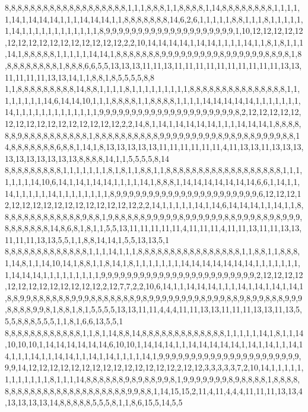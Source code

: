 8,8,8,8,8,8,8,8,8,8,8,8,8,8,8,8,8,8,8,1,1,1,8,8,8,1,1,8,8,8,8,1,14,8,8,8,8,8,8,8,8,1,1,1,1,1,14,1,14,14,14,1,1,1,14,14,14,1,1,8,8,8,8,8,8,8,14,6,2,6,1,1,1,1,1,8,8,1,1,1,8,1,1,1,1,1,1,14,1,1,1,1,1,1,1,1,1,1,1,1,8,9,9,9,9,9,9,9,9,9,9,9,9,9,9,9,9,9,9,9,9,1,10,12,12,12,12,12,12,12,12,12,12,12,12,12,12,12,12,2,2,10,14,14,14,14,1,14,14,1,1,1,1,14,1,1,8,1,8,1,1,1,14,1,8,8,8,8,8,1,1,1,1,1,14,14,1,8,8,8,8,8,8,8,9,9,9,9,9,9,9,9,9,8,9,9,9,9,9,9,8,8,9,8,1,8,8,8,8,8,8,8,8,8,1,8,8,8,6,6,5,5,13,13,13,11,11,13,11,11,11,11,11,11,11,11,11,11,13,13,11,11,11,11,13,13,14,1,1,8,8,1,8,5,5,5,5,8,8
1,1,8,8,8,8,8,8,8,8,8,14,8,8,1,1,1,1,8,1,1,1,1,1,1,1,1,1,8,8,8,8,8,8,8,8,8,8,8,8,8,8,8,1,1,1,1,1,1,1,1,14,6,14,14,10,1,1,1,8,8,8,8,1,1,8,8,8,8,1,1,1,1,14,14,14,14,14,1,1,1,1,1,1,1,14,1,1,1,1,1,1,1,1,1,1,1,1,1,9,9,9,9,9,9,9,9,9,9,9,9,9,9,9,9,9,9,9,9,9,8,2,12,12,12,12,12,12,12,12,12,12,12,12,12,12,12,12,2,2,14,8,1,14,1,14,14,14,14,1,1,1,14,14,14,1,8,8,8,8,8,8,9,8,8,8,8,8,8,8,8,8,8,1,8,8,8,8,8,8,8,8,8,8,9,9,9,9,9,9,9,9,9,8,9,8,9,8,8,9,9,9,9,8,8,14,8,8,8,8,8,8,8,6,8,8,1,14,1,8,13,13,13,13,13,11,11,11,11,11,11,4,11,13,13,11,13,13,13,13,13,13,13,13,13,13,8,8,8,8,14,1,1,5,5,5,5,8,14
8,8,8,8,8,8,8,8,8,1,1,1,1,1,1,1,8,1,8,1,1,8,8,1,1,8,8,8,8,8,8,8,8,8,8,8,8,8,8,8,8,8,8,1,1,1,1,1,1,1,14,10,6,14,1,14,1,14,14,1,1,1,1,14,1,8,8,8,1,14,14,14,14,14,14,14,6,6,1,14,1,1,14,1,1,1,1,1,14,1,1,1,1,1,1,1,1,8,9,9,9,9,9,9,9,9,9,9,9,9,9,9,9,9,9,9,9,9,9,9,6,12,12,12,12,12,12,12,12,12,12,12,12,12,12,12,12,2,2,14,1,1,1,1,1,14,1,14,6,14,14,14,1,1,14,1,1,8,8,8,8,8,8,8,8,8,8,8,8,8,9,8,8,1,9,8,8,8,8,8,9,9,9,9,9,8,9,9,9,9,9,9,8,8,9,9,9,8,8,9,8,9,9,9,8,8,8,8,8,8,8,14,8,6,8,1,8,1,1,5,5,13,11,11,11,11,11,4,11,11,11,4,11,11,13,11,11,13,13,11,11,11,13,13,5,5,1,1,8,8,14,14,1,5,5,13,13,5,1
8,8,8,8,8,8,8,8,8,8,8,8,8,1,1,1,14,1,1,1,8,8,8,8,8,8,8,8,8,8,8,8,8,8,8,8,1,1,8,8,1,1,8,8,8,1,14,8,1,1,14,10,14,1,8,8,1,1,8,14,1,8,1,1,1,1,1,1,1,14,14,14,14,14,14,14,1,1,1,1,1,1,1,1,14,14,14,1,1,1,1,1,1,1,1,1,9,9,9,9,9,9,9,9,9,9,9,9,9,9,9,9,9,9,9,9,9,9,9,9,2,12,12,12,12,12,12,12,12,12,12,12,12,12,2,12,7,7,2,2,10,6,14,1,1,14,14,14,1,1,1,14,1,14,1,14,1,14,1,8,8,9,9,8,8,8,8,8,8,9,9,9,8,8,8,8,8,8,8,9,8,9,9,9,9,9,9,9,9,8,9,9,9,8,8,9,8,9,9,8,8,8,9,9,9,8,8,8,8,9,9,8,1,8,8,1,8,1,5,5,5,5,13,13,11,11,4,4,4,11,11,13,13,11,11,11,13,13,11,13,5,5,5,8,8,8,5,5,5,1,1,8,1,6,6,13,5,5,1
8,8,8,8,8,8,8,8,8,8,8,8,1,1,8,1,14,8,8,14,8,8,8,8,8,8,8,8,8,8,8,8,8,1,1,1,1,1,14,1,8,1,1,14,10,10,10,1,14,14,14,14,14,14,6,10,10,1,14,14,14,1,1,14,14,14,14,14,1,14,1,14,1,1,14,14,1,1,1,14,1,1,14,14,1,1,14,1,14,1,1,1,1,14,1,9,9,9,9,9,9,9,9,9,9,9,9,9,9,9,9,9,9,9,9,9,9,9,9,14,12,12,12,12,12,12,12,12,12,12,12,12,12,12,2,12,12,3,3,3,3,3,7,2,10,14,1,1,1,1,1,1,1,1,1,1,1,1,8,1,1,1,14,8,8,8,8,8,8,9,8,9,8,8,9,9,8,1,9,9,9,9,9,9,9,8,9,8,8,8,8,1,8,8,8,8,8,8,8,8,8,8,8,8,8,8,8,8,8,8,8,8,8,8,8,9,9,8,8,1,14,15,15,2,11,4,11,4,4,4,11,11,11,13,13,4,13,13,13,13,14,8,8,8,8,8,5,5,5,8,1,1,8,6,15,5,14,5,5
